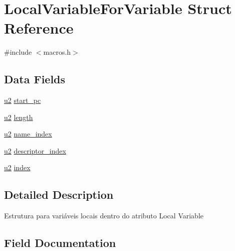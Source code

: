 \hypertarget{struct_local_variable_for_variable}{}\section{Local\+Variable\+For\+Variable Struct Reference}
\label{struct_local_variable_for_variable}


{\ttfamily \#include $<$macros.\+h$>$}

\subsection*{Data Fields}
\begin{DoxyCompactItemize}
\item 
\hyperlink{macros_8h_a732cde1300aafb73b0ea6c2558a7a54f}{u2} \hyperlink{struct_local_variable_for_variable_a3ded0b47a89e0816c20dc577a82a1cd5}{start\+\_\+pc}
\item 
\hyperlink{macros_8h_a732cde1300aafb73b0ea6c2558a7a54f}{u2} \hyperlink{struct_local_variable_for_variable_ad01efb9db3818b64eae5965bf341710f}{length}
\item 
\hyperlink{macros_8h_a732cde1300aafb73b0ea6c2558a7a54f}{u2} \hyperlink{struct_local_variable_for_variable_ae939ac3ca00f5727beaa02d0e339183d}{name\+\_\+index}
\item 
\hyperlink{macros_8h_a732cde1300aafb73b0ea6c2558a7a54f}{u2} \hyperlink{struct_local_variable_for_variable_a3f13794b6c8b4ffc87b87a7c01a69060}{descriptor\+\_\+index}
\item 
\hyperlink{macros_8h_a732cde1300aafb73b0ea6c2558a7a54f}{u2} \hyperlink{struct_local_variable_for_variable_a125cab34bc0dc872fa4a0aedbe688365}{index}
\end{DoxyCompactItemize}


\subsection{Detailed Description}
Estrutura para variáveis locais dentro do atributo Local Variable 

\subsection{Field Documentation}
\hypertarget{struct_local_variable_for_variable_a3f13794b6c8b4ffc87b87a7c01a69060}{}
